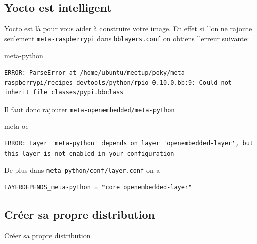 \documentclass[compress]{smilebeamer}
\begin{document}
\subsection{Yocto est intelligent}
\begin{frame}[fragile]
Yocto est là pour vous aider à construire votre image.\newline
En effet si l'on ne rajoute seulement \texttt{meta-raspberrypi} dans \texttt{bblayers.conf} on obtiens l'erreur suivante:

\begin{block}{meta-python}
\begin{lstlisting}[basicstyle=\footnotesize\ttfamily\color{red!80!black!60}]
ERROR: ParseError at /home/ubuntu/meetup/poky/meta-raspberrypi/recipes-devtools/python/rpio_0.10.0.bb:9: Could not inherit file classes/pypi.bbclass
\end{lstlisting}
Il faut donc rajouter \texttt{meta-openembedded/meta-python}
\end{block}

\begin{block}{meta-oe}
\begin{lstlisting}[basicstyle=\footnotesize\ttfamily\color{red!80!black!60}]
ERROR: Layer 'meta-python' depends on layer 'openembedded-layer', but this layer is not enabled in your configuration
\end{lstlisting}
De plus dans \texttt{meta-python/conf/layer.conf} on a
\begin{lstlisting}[style=bitbake]
LAYERDEPENDS_meta-python = "core openembedded-layer"
\end{lstlisting}
\end{block}
\end{frame}


\subsection{Créer sa propre distribution}
\begin{frame}
\begin{center}
\textcolor{smileOrange}{\huge{Créer sa propre distribution}}
\end{center}
\end{frame}
\end{document}
